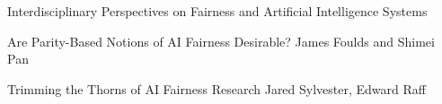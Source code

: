 \documentclass[11pt]{article}
\begin{document}
\begin{bulletin}
\begin{articlesection}{Interdisciplinary Perspectives on Fairness and Artificial Intelligence Systems}
\begin{article}
{Are Parity-Based Notions of AI Fairness Desirable?}
{James Foulds and Shimei Pan}
\graphicspath{{submissions/foulds_pan_final/figs/}}

\end{article}

\makeatletter
\renewcommand{\AB@affillist}{}
\renewcommand{\AB@authlist}{}
\setcounter{authors}{0}
\makeatother

\begin{article}
{Trimming the Thorns of AI Fairness Research}
{Jared Sylvester, Edward Raff}
\graphicspath{{submissions/sylvester_raff_final/}}

\end{article}

\end{articlesection}




%
%



\begin{callsection}


\end{callsection}
\end{bulletin}
\end{document}
